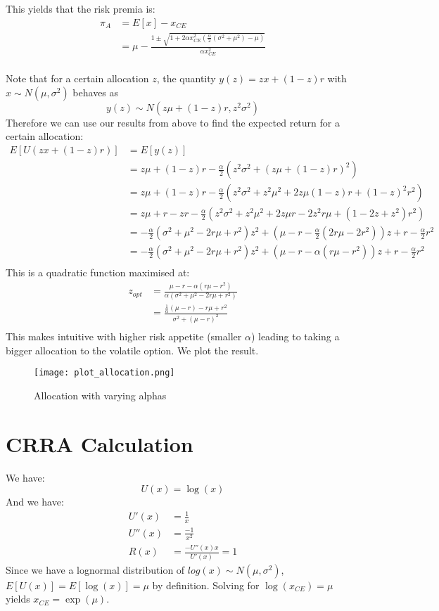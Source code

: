 \documentclass{article}[12pt]
\begin{document}
This yields that the risk premia is:
\begin{align*}
\pi_{A} &= E[x] - x_{CE}\\
&= \mu -  \frac{1 \pm \sqrt{1 + 2\alpha x_{CE}^2 (\frac{\alpha}{2}(\sigma^2 + \mu^2 ) - \mu)}}{\alpha x_{CE}^2}\\
\end{align*}

Note that for a certain allocation $z$, the quantity $y(z) = zx + (1-z)r$ with $x\sim N(\mu,\sigma^2) $ behaves as $$y(z)\sim N(z\mu+(1-z)r, z^2\sigma^2)$$ 
Therefore we can use our results from above to find the expected return for a certain allocation:
\begin{align*}
E[U(zx + (1-z)r)] &= E[y(z)]\\
&= z\mu+(1-z)r - \frac{\alpha}{2}(z^2\sigma^2 + (z\mu+(1-z)r)^2 )\\
&= z\mu+(1-z)r - \frac{\alpha}{2}(z^2\sigma^2 + z^2\mu^2 + 2z\mu(1-z)r + (1-z)^2r^2 )\\
&= z\mu+r -zr - \frac{\alpha}{2}(z^2\sigma^2 + z^2\mu^2 + 2z\mu r - 2z^2r\mu  + (1-2z + z^2)r^2 )\\
&=- \frac{\alpha}{2}(\sigma^2+ \mu^2-2r\mu+r^2)z^2  + (\mu -r - \frac{\alpha}{2}(2r\mu -2r^2))z + r - \frac{\alpha}{2}r^2\\
&=- \frac{\alpha}{2}(\sigma^2+ \mu^2-2r\mu+r^2)z^2  + (\mu -r - \alpha(r\mu -r^2))z + r - \frac{\alpha}{2}r^2\\
\end{align*}
This is a quadratic function maximised at:
\begin{align*}
z_{opt} &= \frac{\mu -r - \alpha(r\mu -r^2)}{\alpha(\sigma^2+ \mu^2-2r\mu+r^2)}\\
&= \frac{\frac{1}{\alpha}(\mu -r) -r\mu +r^2}{\sigma^2+ (\mu-r)^2}\\
\end{align*}
This makes intuitive with higher risk appetite (smaller $\alpha$) leading to taking a bigger allocation to the volatile option. We plot the result.

\begin{figure}
  \texttt{[image: plot\_allocation.png]}
  \caption{Allocation with varying alphas}
  \label{fig:llp3}
\end{figure}

\section{CRRA Calculation}
We have:
$$ U(x) = \log(x)$$
And we have:
\begin{align*}
U'(x) &= \frac{1}{x}\\
U''(x) &= \frac{-1}{x^2}\\
R(x) &= \frac{-U''(x)x}{U'(x)} = 1
\end{align*}
Since we have a lognormal distribution of $log(x) \sim N(\mu,\sigma^2)$, $E[U(x)] = E[\log(x)] = \mu$ by definition. Solving for $\log(x_{CE}) = \mu$ yields $x_{CE} = \exp(\mu)$.
\end{document}
